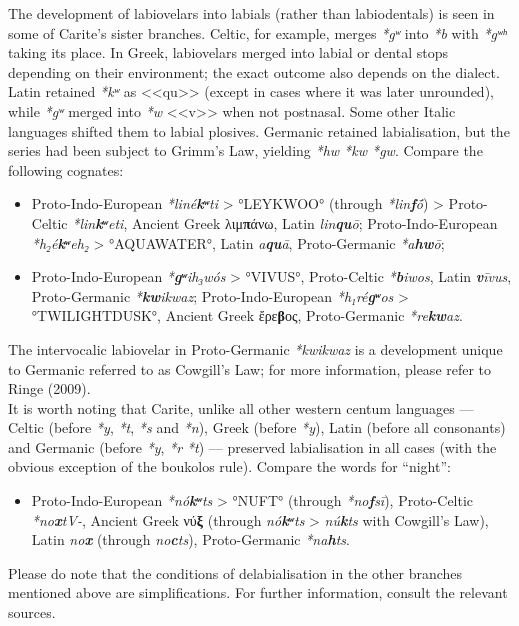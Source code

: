 \documentclass[svgnames,x11names,b5paper]{book}
\begin{document}
            The development of labiovelars into labials (rather than labiodentals) is seen in some of Carite's sister branches. Celtic, for example, merges \textit{*gʷ} into \textit{*b} with \textit{*gʷʰ} taking its place. In Greek, labiovelars merged into labial or dental stops depending on their environment; the exact outcome also depends on the dialect. Latin retained \textit{*kʷ} as <<qu>> (except in cases where it was later unrounded), while \textit{*gʷ} merged into \textit{*w} <<v>> when not postnasal. Some other Italic languages shifted them to labial plosives. Germanic retained labialisation, but the series had been subject to Grimm's Law, yielding \textit{*hw *kw *gw}. Compare the following cognates:
\begin{itemize}
\item  Proto-Indo-European \textit{*liné\textbf{kʷ}ti} > °LEYKWOO° (through \textit{*lin\textbf{f}ṓ}) > Proto-Celtic \textit{*lin\textbf{kʷ}eti}, Ancient Greek λιμ\textbf{π}άνω, Latin \textit{lin\textbf{qu}ō}; Proto-Indo-European \textit{*h₂é\textbf{kʷ}eh₂} > °AQUAWATER°, Latin \textit{a\textbf{qu}ā}, Proto-Germanic \textit{*a\textbf{hw}ō};\\
\item  Proto-Indo-European \textit{*\textbf{gʷ}ih₃wós} > °VIVUS°, Proto-Celtic \textit{*\textbf{b}iwos}, Latin \textit{\textbf{v}īvus}, Proto-Germanic \textit{*\textbf{kw}ikwaz}; Proto-Indo-European \textit{*h₁ré\textbf{gʷ}os} > °TWILIGHTDUSK°, Ancient Greek ἔρε\textbf{β}ος, Proto-Germanic \textit{*re\textbf{kw}az}.\\
\end{itemize}
The intervocalic labiovelar in Proto-Germanic \textit{*kwikwaz} is a development unique to Germanic referred to as Cowgill's Law; for more information, please refer to Ringe (2009).\\
It is worth noting that Carite, unlike all other western centum languages — Celtic (before \textit{*y}, \textit{*t}, \textit{*s} and \textit{*n}), Greek (before \textit{*y}), Latin (before all consonants) and Germanic (before \textit{*y}, \textit{*r} \textit{*t}) — preserved labialisation in all cases (with the obvious exception of the boukolos rule). Compare the words for “night”:
\begin{itemize}
\item  Proto-Indo-European \textit{*nó\textbf{kʷ}ts} > °NUFT° (through \textit{*no\textbf{f}sī}), Proto-Celtic \textit{*no\textbf{x}tV-}, Ancient Greek νύ\textbf{ξ} (through \textit{nó\textbf{kʷ}ts} > \textit{nú\textbf{k}ts} with Cowgill's Law), Latin \textit{no\textbf{x}} (through \textit{no\textbf{c}ts}), Proto-Germanic \textit{*na\textbf{h}ts}.\\
\end{itemize}
Please do note that the conditions of delabialisation in the other branches mentioned above are simplifications. For further information, consult the relevant sources.
\end{document}
